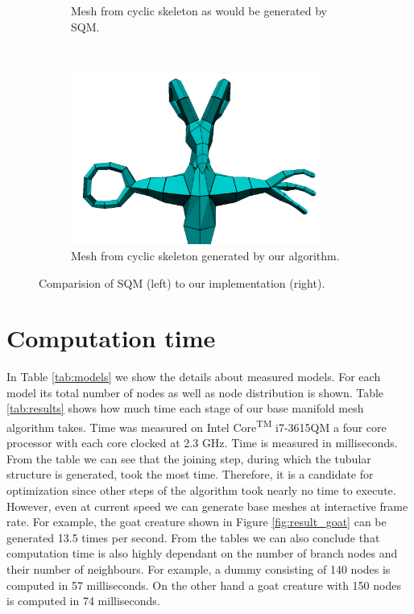 \begin{figure}[ht]
\begin{subfigure}[b]{0.45\textwidth}
            \caption{Mesh from cyclic skeleton as would be generated by SQM.}
            \label{fig:comp_cycle_sqm}
        \end{subfigure}
        ~ %
        \begin{subfigure}[b]{0.45\textwidth}
        	\centering
			\includegraphics[width=0.9\textwidth]{images/goat_amput_3}
            \caption{Mesh from cyclic skeleton generated by our algorithm.}
            \label{fig:comp_cycle}
        \end{subfigure}
        \caption{Comparision of SQM (left) to our implementation (right).}
        \label{fig:comp_ilu}
\end{figure}

\section{Computation time}

In Table \ref{tab:models} we show the details about measured models.
For each model its total number of nodes as well as node distribution is shown.
Table \ref{tab:results} shows how much time each stage of our base manifold mesh algorithm takes.
Time was measured on Intel\textsuperscript{\textregistered}  Core\textsuperscript{TM} i7-3615QM a four core processor with each core clocked at 2.3 GHz.
Time is measured in milliseconds.
From the table we can see that the joining step, during which the tubular structure is generated, took the most time.
Therefore, it is a candidate for optimization since other steps of the algorithm took nearly no time to execute.
However, even at current speed we can generate base meshes at interactive frame rate.
For example, the goat creature shown in Figure \ref{fig:result_goat} can be generated 13.5 times per second.
From the tables we can also conclude that computation time is also highly dependant on the number of branch nodes and their number of neighbours.
For example, a dummy consisting of 140 nodes is computed in 57 milliseconds.
On the other hand a goat creature with 150 nodes is computed in 74 milliseconds.

